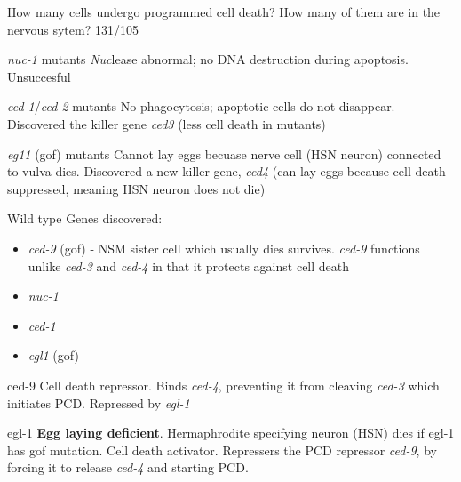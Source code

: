 
\begin{flashcard}[Apoptosis]{How many cells undergo programmed cell death? How many of them are in the nervous sytem?}
    131/105
\end{flashcard}

\begin{flashcard}{\textit{nuc-1} mutants}
        \textit{Nuc}lease abnormal; no DNA destruction during apoptosis. Unsuccesful
\end{flashcard}

\begin{flashcard}{\textit{ced-1}/\textit{ced-2} mutants}
        No phagocytosis; apoptotic cells do not disappear. Discovered the killer gene \textit{ced3} (less cell death in mutants)
\end{flashcard}

\begin{flashcard}{\textit{eg11} (gof) mutants}
        Cannot lay eggs becuase nerve cell (HSN neuron) connected to vulva dies. Discovered a new killer gene, \textit{ced4} (can lay eggs because cell death suppressed, meaning HSN neuron does not die)
\end{flashcard}

\begin{flashcard}{Wild type}
    Genes discovered:
    \begin{itemize}
        \item \textit{ced-9} (gof) - NSM sister cell which usually dies survives. \textit{ced-9} functions unlike \textit{ced-3} and \textit{ced-4} in that it protects against cell death
        \item \textit{nuc-1}
        \item \textit{ced-1}
        \item \textit{egl1} (gof)
    \end{itemize}
\end{flashcard}


\begin{flashcard}{ced-9}
    Cell death repressor. Binds \textit{ced-4}, preventing it from cleaving \textit{ced-3} which initiates PCD. Repressed by \textit{egl-1}
\end{flashcard}

\begin{flashcard}{egl-1}
    \textbf{Egg laying deficient}. Hermaphrodite specifying neuron (HSN) dies if egl-1 has gof mutation. Cell death activator. Repressers the PCD repressor \textit{ced-9}, by forcing it to release \textit{ced-4} and starting PCD. 
\end{flashcard}

